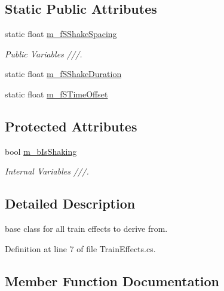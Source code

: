 \subsection*{Static Public Attributes}
\begin{DoxyCompactItemize}
\item 
static float \mbox{\hyperlink{class_train_effects_a0a373ff901cb4f1314905fbe0000e519}{m\+\_\+f\+S\+Shake\+Spacing}}
\begin{DoxyCompactList}\small\item\em Public Variables ///. \end{DoxyCompactList}\item 
static float \mbox{\hyperlink{class_train_effects_a1e9949427d6c1e1e3d7d2c5d5a21d46b}{m\+\_\+f\+S\+Shake\+Duration}}
\item 
static float \mbox{\hyperlink{class_train_effects_a556edd33d84615059499b6ba1542a958}{m\+\_\+f\+S\+Time\+Offset}}
\end{DoxyCompactItemize}
\subsection*{Protected Attributes}
\begin{DoxyCompactItemize}
\item 
bool \mbox{\hyperlink{class_train_effects_a449cd1a05e3642c8e588d5ce13c9e0c2}{m\+\_\+b\+Is\+Shaking}}
\begin{DoxyCompactList}\small\item\em Internal Variables ///. \end{DoxyCompactList}\end{DoxyCompactItemize}


\subsection{Detailed Description}
base class for all train effects to derive from. 



Definition at line 7 of file Train\+Effects.\+cs.



\subsection{Member Function Documentation}
\mbox{\label{class_train_effects_a444cb0c6444a8945f5e1a7f02dc83b99}} 

